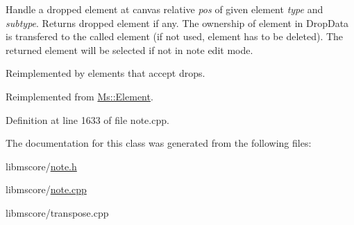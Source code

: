 Handle a dropped element at canvas relative {\itshape pos} of given element {\itshape type} and {\itshape subtype}. Returns dropped element if any. The ownership of element in Drop\+Data is transfered to the called element (if not used, element has to be deleted). The returned element will be selected if not in note edit mode.

Reimplemented by elements that accept drops. 

Reimplemented from \hyperlink{class_ms_1_1_element_a0ca69a9fb48e7b9fb481aacaf3860032}{Ms\+::\+Element}.



Definition at line 1633 of file note.\+cpp.



The documentation for this class was generated from the following files\+:\begin{DoxyCompactItemize}
\item 
libmscore/\hyperlink{note_8h}{note.\+h}\item 
libmscore/\hyperlink{note_8cpp}{note.\+cpp}\item 
libmscore/transpose.\+cpp\end{DoxyCompactItemize}
